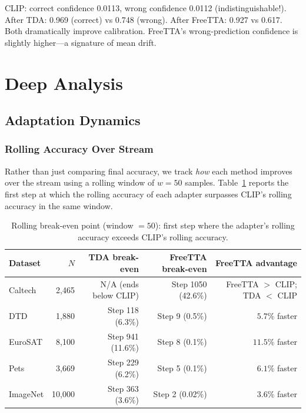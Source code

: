 \documentclass[12pt,a4paper]{article}
\newcommand{\1}{\mathbf{1}}
\begin{document}
\begin{tcolorbox}[findingbox, title={Finding 5: Both methods fix CLIP's broken calibration.}]
CLIP: correct confidence 0.0113, wrong confidence 0.0112 (indistinguishable!).\\
After TDA: 0.969 (correct) vs 0.748 (wrong). After FreeTTA: 0.927 vs 0.617.\\
Both dramatically improve calibration.
FreeTTA's wrong-prediction confidence is slightly higher---a signature of mean drift.
\end{tcolorbox}

\section{Deep Analysis}

\subsection{Adaptation Dynamics}

\subsubsection{Rolling Accuracy Over Stream}

Rather than just comparing final accuracy, we track \emph{how} each method improves over the stream
using a rolling window of $w=50$ samples.
Table~\ref{tab:break_even_rolling} reports the first step at which the rolling accuracy of each
adapter surpasses CLIP's rolling accuracy in the same window.

\begin{table}[H]
\centering
\caption{Rolling break-even point (window $= 50$): first step where the adapter's rolling accuracy
exceeds CLIP's rolling accuracy.}
\label{tab:break_even_rolling}
\begin{tabular}{@{}lrrrr@{}}
\toprule
Dataset & $N$ & TDA break-even & FreeTTA break-even & FreeTTA advantage \\
\midrule
Caltech  & 2,465  & N/A (ends below CLIP) & Step 1050 (42.6\%)  & FreeTTA $>$ CLIP; TDA $<$ CLIP \\
DTD      & 1,880  & Step 118 (6.3\%)       & Step 9 (0.5\%)      & $5.7\%$ faster \\
EuroSAT  & 8,100  & Step 941 (11.6\%)      & Step 8 (0.1\%)      & $11.5\%$ faster \\
Pets     & 3,669  & Step 229 (6.2\%)       & Step 5 (0.1\%)      & $6.1\%$ faster \\
ImageNet & 10,000 & Step 363 (3.6\%)       & Step 2 (0.02\%)     & $3.6\%$ faster \\
\bottomrule
\end{tabular}
\end{table}
\end{document}
